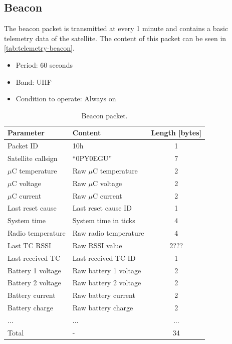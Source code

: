 \subsection{Beacon}

The beacon packet is transmitted at every 1 minute and contains a basic telemetry data of the satellite. The content of this packet can be seen in \autoref{tab:telemetry-beacon}.

\begin{itemize}
    \item Period: 60 seconds
    \item Band: UHF
    \item Condition to operate: Always on
\end{itemize}

\begin{table}[!h]
    \centering
    \begin{tabular}{llc}
        \toprule[1.5pt]
        \textbf{Parameter} & \textbf{Content}       & \textbf{Length [bytes]} \\
        \midrule
        Packet ID          & 10h                    & 1 \\
        Satellite callsign & ``0PY0EGU''            & 7 \\
        $\mu$C temperature & Raw $\mu$C temperature & 2 \\
        $\mu$C voltage     & Raw $\mu$C voltage     & 2 \\
        $\mu$C current     & Raw $\mu$C current     & 2 \\
        Last reset cause   & Last reset cause ID    & 1 \\
        System time        & System time in ticks   & 4 \\
        Radio temperature  & Raw radio temperature  & 4 \\
        Last TC RSSI       & Raw RSSI value         & 2??? \\
        Last received TC   & Last received TC ID    & 1 \\
        Battery 1 voltage  & Raw battery 1 voltage  & 2 \\
        Battery 2 voltage  & Raw battery 2 voltage  & 2 \\
        Battery current    & Raw battery current    & 2 \\
        Battery charge     & Raw battery charge     & 2 \\
        ...                & ...                    & ... \\
        \midrule
        Total              & -                      & 34 \\
        \bottomrule[1.5pt]
    \end{tabular}
    \caption{Beacon packet.}
    \label{tab:telemetry-beacon}
\end{table}


